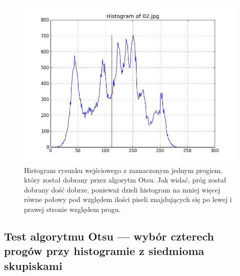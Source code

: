 \documentclass[10pt]{llncs}
\begin{document}
\begin{figure}[h!]
  \centering
  \includegraphics[scale=.3, clip]{img/03_histogram.jpg}
	\caption[]
  {Histogram rysunku wejściowego z zaznaczonym jednym progiem, który został dobrany przez algorytm Otsu. Jak widać, próg został dobrany dość dobrze, ponieważ dzieli histogram na mniej więcej równe połowy pod względem ilości piseli znajdujących się po lewej i prawej stronie względem progu.}
\end{figure}

\subsection{Test algorytmu Otsu --- wybór czterech progów przy histogramie z siedmioma skupiskami}
\end{document}
